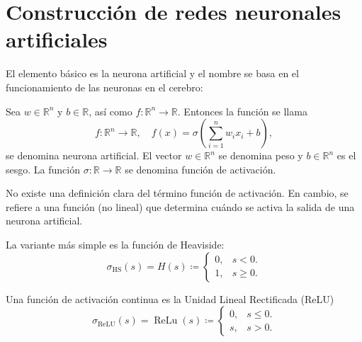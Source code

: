 \section{Construcción de redes neuronales artificiales}

\begin{frame}
    El elemento básico es la neurona artificial y el nombre se basa en
    el funcionamiento de las neuronas en el cerebro:

    \pause

    \begin{definition}
        Sea $w\in\mathbb{R}^{n}$ y $b\in\mathbb{R}$, así como
        $f\colon\mathbb{R}^{n}\to\mathbb{R}$.
        Entonces la función se llama
        \vspace*{-.5\baselineskip}\setlength\belowdisplayshortskip{0pt}
        \begin{equation*}
            f\colon\mathbb{R}^{n}\to\mathbb{R},\quad
            f\left(x\right)=\sigma\left(\sum_{i=1}^{n}w_{i}x_{i}+b\right),
        \end{equation*}
        se denomina \alert{neurona artificial}.
        El vector $w\in\mathbb{R}^{n}$ se denomina peso y
        $b\in\mathbb{R}^{n}$ es el sesgo.
        La función $\sigma\colon\mathbb{R}\to\mathbb{R}$ se denomina
        \alert{función de activación}.
    \end{definition}

    \pause

    No existe una definición clara del término función de activación.
    En cambio, se refiere a una función (no lineal) que determina
    cuándo se activa la salida de una neurona artificial.

    La variante más simple es la función de Heaviside:
    \vspace*{-.5\baselineskip}\setlength\belowdisplayshortskip{0pt}
    \begin{equation*}
        \sigma_{\text{HS}}\left(s\right)=
        H\left(s\right)\coloneqq
        \begin{cases}
            0, & s< 0.   \\
            1, & s\geq0.
        \end{cases}
    \end{equation*}

    Una función de activación continua es la
    \alert{Unidad Lineal Rectificada} (ReLU)
    \begin{equation*}
        \sigma_{\text{ReLU}}\left(s\right)=
        \operatorname{ReLu}\left(s\right)\coloneqq
        \begin{cases}
            0, & s\leq 0. \\
            s, & s>0.
        \end{cases}
    \end{equation*}


\end{frame}
